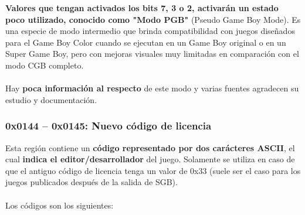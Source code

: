 \textbf{Valores que tengan activados los bits 7, 3 o 2, activarán un estado poco utilizado, conocido como "Modo PGB"} (Pseudo Game Boy Mode). Es una especie de modo intermedio que brinda compatibilidad con juegos diseñados para el Game Boy Color cuando se ejecutan en un Game Boy original o en un Super Game Boy, pero con mejoras visuales muy limitadas en comparación con el modo CGB completo.
\\\\
Hay \textbf{poca información al respecto} de este modo y varias fuentes agradecen su estudio y documentación.

\subsubsection{0x0144 – 0x0145: Nuevo código de licencia}
Esta región contiene un \textbf{código representado por dos carácteres ASCII}, el cual \textbf{indica el editor/desarrollador} del juego. Solamente se utiliza en caso de que el antiguo código de licencia tenga un valor de 0x33 (suele ser el caso para los juegos publicados después de la salida de SGB).
\\\\
Los códigos son los siguientes:
